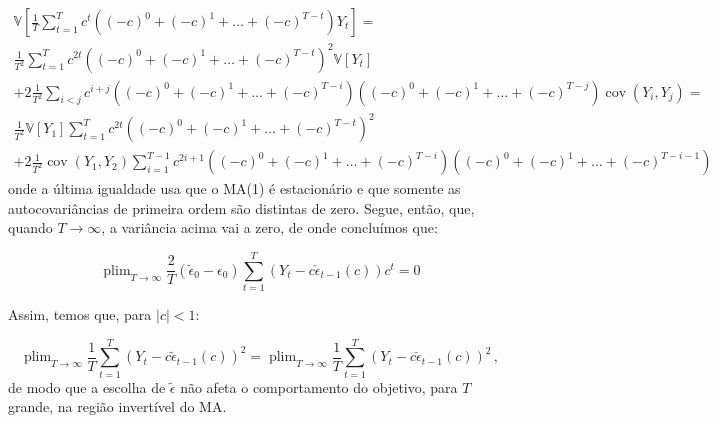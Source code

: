 \documentclass[10pt,a4paper]{article}
\begin{document}
\begin{equation}
	\begin{aligned}
		\mathbb{V}\left[ \frac{1}{T}\sum_{t=1}^T c^{t}((-c)^{0} + (-c)^{1} + \ldots + (-c)^{T-t})Y_t\right] = \\ \frac{1}{T^2} \sum_{t=1}^T c^{2t}((-c)^{0} + (-c)^{1} + \ldots +  (-c)^{T-t})^2 \mathbb{V}[Y_t] \\ + 2 \frac{1}{T^2}\sum_{i< j}c^{i+j} ((-c)^{0} + (-c)^{1} + \ldots +  (-c)^{T-i})((-c)^{0} + (-c)^{1} + \ldots +  (-c)^{T-j})\operatorname{cov}(Y_i,Y_j) = \\
		\frac{1}{T^2}  \mathbb{V}[Y_1] \sum_{t=1}^T c^{2t}((-c)^{0} + (-c)^{1} + \ldots +  (-c)^{T-t})^2 \\ + 2 \frac{1}{T^2}\operatorname{cov}(Y_1,Y_2) \sum_{i= 1}^{T-1}c^{2i+1} ((-c)^{0} + (-c)^{1} + \ldots +  (-c)^{T-i})((-c)^{0} + (-c)^{1} + \ldots +  (-c)^{T-i-1})
	\end{aligned}
\end{equation}
onde a última igualdade usa que o MA(1) é estacionário e que somente as autocovariâncias de primeira ordem são distintas de zero. Segue, então, que, quando	$T \to \infty$, a variância acima vai a zero, de onde concluímos que: 

$$\operatorname{plim}_{T\to \infty} \frac{2}{T}(\tilde{\epsilon}_0 - \epsilon_0)\sum_{t=1}^T(Y_t - c \check{\epsilon}_{t-1}(c))c^t = 0$$

Assim, temos que, para $|c| < 1$:

$$	\operatorname{plim}_{T\to \infty}\frac{1}{T}\sum_{t=1}^T (Y_t - c \tilde \epsilon_{t-1}(c))^2 =\operatorname{plim}_{T\to \infty} \frac{1}{T}\sum_{t=1}^T (Y_t - c \check \epsilon_{t-1}(c))^2\,,$$
de modo que a escolha de $\tilde{\epsilon}$ não afeta o comportamento do objetivo, para $T$ grande, na região invertível do MA.
\end{document}
